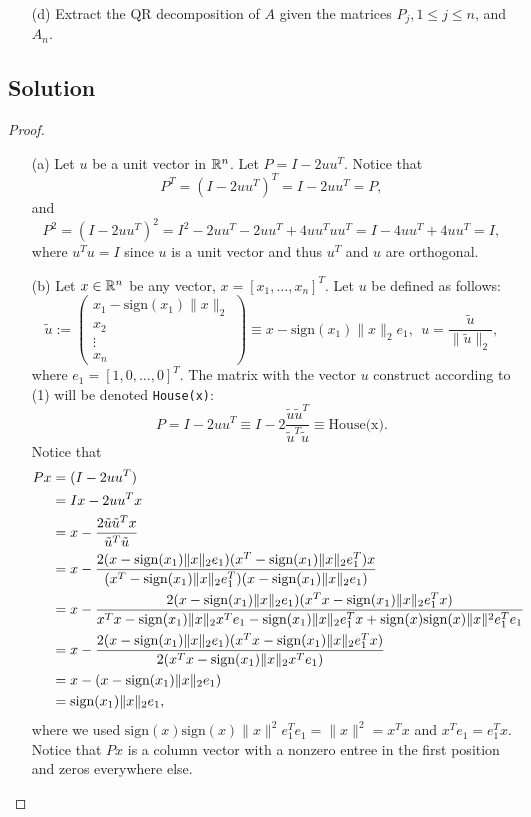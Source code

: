 \documentclass[12pt]{report}
\begin{document}
\begin{problem}
\begin{enumerate}
    \item[(d)] Extract the QR decomposition of $A$ given the matrices $P_j, 1 \leq j \leq n$, and $A_n$. 
    
\end{enumerate}

\subsection*{Solution}
\begin{proof}

\begin{enumerate}
    \item [(a)]
    Let $u$ be a unit vector in ${\mathbb R}^n$. Let $P = I - 2uu^T$. Notice that
    \[
         P^T = (I - 2uu^T)^T = I - 2uu^T = P, 
    \]
    and
    \[
         P^2 = (I - 2uu^T)^2 = I^2 - 2uu^T - 2uu^T + 4uu^Tuu^T = I - 4uu^T + 4uu^T = I, 
    \]
    where $u^Tu =I$ since $u$ is a unit vector and thus $u^T$ and $u$ are orthogonal. 



    \item [(b)]
    Let $x \in {\mathbb R}^n$ be any vector, $x = [x_1,\dots,x_n]^T$. Let $u$ be defined as follows:
    \[
         \tilde{u} := \begin{pmatrix}
            x_1 - \text{sign}(x_1)\|x\|_2\\x_2\\\vdots\\x_n
         \end{pmatrix} \equiv x - \text{sign}(x_1)\|x\|_2e_1,~~u=\frac{\tilde{u}}{\|\tilde{u}\|_2},
    \]
    where $e_1 = [1,0,\dots,0]^T$. The matrix with the vector $u$ construct according to (1) will be denoted \verb+House(x)+:
    \[
         P = I - 2uu^T \equiv I - 2 \frac{\tilde{u}\tilde{u}^T}{\tilde{u}^T\tilde{u}}\equiv \text{House(x)}.
    \]
    Notice that
    \begin{align*}
          Px &= (I - 2uu^T)\\
          &= Ix - 2uu^Tx\\
          &= x - \frac{2\tilde{u}\tilde{u}^Tx}{\tilde{u}^T\tilde{u}}\\
          &= x - \frac{2(x - \text{sign}(x_1) \|x\|_2 e_1)(x^T - \text{sign}(x_1) \|x\|_2 e_1^T)x}{(x^T - \text{sign}(x_1)\|x\|_2e_1^T)(x - \text{sign}(x_1)\|x\|_2e_1)}\\
          &= x - \frac{2(x - \text{sign}(x_1) \|x\|_2 e_1)(x^Tx - \text{sign}(x_1)\|x\|_2e_1^Tx)}{x^Tx - \text{sign}(x_1)\|x\|_2x^Te_1 - \text{sign}(x_1)\|x\|_2e_1^Tx + \text{sign}(x)\text{sign}(x)\|x\|^2e_1^Te_1}\\
          &= x - \frac{2(x - \text{sign}(x_1) \|x\|_2 e_1)(x^Tx - \text{sign}(x_1)\|x\|_2e_1^Tx)}{2{\left(x^Tx - \text{sign}(x_1)\|x\|_2x^Te_1\right)}}\\
          &=x - (x - \text{sign}(x_1)\|x\|_2e_1)\\
          &= \text{sign}(x_1)\|x\|_2e_1,
    \end{align*}
    where we used $\text{sign}(x)\text{sign}(x)\|x\|^2e_1^Te_1 = \|x\|^2 = x^Tx$ and $x^Te_1 = e_1^Tx$. Notice that $Px$ is a column vector with a nonzero entree in the first position and zeros everywhere else.



\end{enumerate}
\end{proof}
\end{problem}
\end{document}
